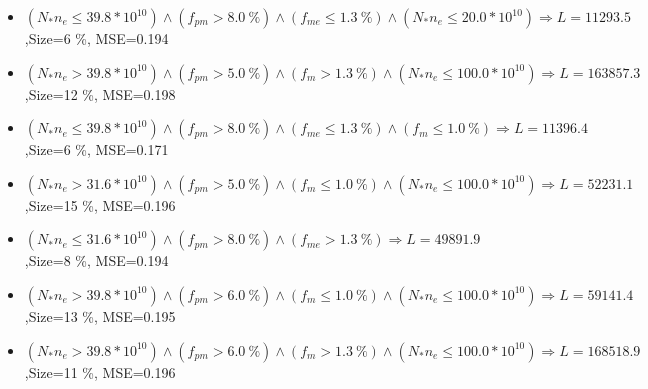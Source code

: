 \documentclass[numbered]{CSL}
\begin{document}
\begin{itemize}
\item $(N_* n_e \leq 39.8 * 10^{10}) \land (f_{pm} > 8.0~\%) \land (f_{me} \leq 1.3~\%) \land (N_* n_e \leq 20.0 * 10^{10}) \Rightarrow L = 11293.5$,\hfill Size=6 \%, MSE=0.194
\item $(N_* n_e > 39.8 * 10^{10}) \land (f_{pm} > 5.0~\%) \land (f_m > 1.3~\%) \land (N_* n_e \leq 100.0 * 10^{10}) \Rightarrow L = 163857.3$,\hfill Size=12 \%, MSE=0.198
\item $(N_* n_e \leq 39.8 * 10^{10}) \land (f_{pm} > 8.0~\%) \land (f_{me} \leq 1.3~\%) \land (f_m \leq 1.0~\%) \Rightarrow L = 11396.4$,\hfill Size=6 \%, MSE=0.171
\item $(N_* n_e > 31.6 * 10^{10}) \land (f_{pm} > 5.0~\%) \land (f_m \leq 1.0~\%) \land (N_* n_e \leq 100.0 * 10^{10}) \Rightarrow L = 52231.1$,\hfill Size=15 \%, MSE=0.196
\item $(N_* n_e \leq 31.6 * 10^{10}) \land (f_{pm} > 8.0~\%) \land (f_{me} > 1.3~\%) \Rightarrow L = 49891.9$,\hfill Size=8 \%, MSE=0.194
\item $(N_* n_e > 39.8 * 10^{10}) \land (f_{pm} > 6.0~\%) \land (f_m \leq 1.0~\%) \land (N_* n_e \leq 100.0 * 10^{10}) \Rightarrow L = 59141.4$,\hfill Size=13 \%, MSE=0.195
\item $(N_* n_e > 39.8 * 10^{10}) \land (f_{pm} > 6.0~\%) \land (f_m > 1.3~\%) \land (N_* n_e \leq 100.0 * 10^{10}) \Rightarrow L = 168518.9$,\hfill Size=11 \%, MSE=0.196
\end{itemize}
\end{document}

